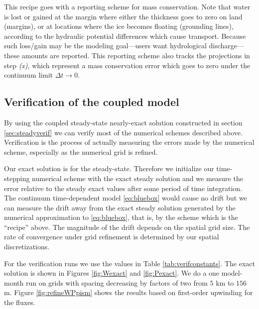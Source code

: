 \documentclass[11pt,final]{amsart}
\begin{document}
\medskip
This recipe goes with a reporting scheme for mass conservation.  Note that water is lost or gained at the margin where either the thickness goes to zero on land (margins), or at locations where the ice becomes floating (grounding lines), according to the hydraulic potential differences which cause transport.  Because such loss/gain may be the modeling goal---users want hydrological discharge---these amounts are reported.  This reporting scheme also tracks the projections in step \emph{(x)}, which represent a mass conservation error which goes to zero under the continuum limit $\Delta t\to 0$.

\subsection*{Verification of the coupled model}  By using the coupled steady-state nearly-exact solution constructed in section \ref{sec:steadyverif} we can verify most of the numerical schemes described above.  Verification is the process of actually measuring the errors made by the numerical scheme, especially as the numerical grid is refined.

Our exact solution is for the steady-state.  Therefore we initialize our time-stepping numerical scheme with the exact steady solution and we measure the error relative to the steady exact values after some period of time integration.  The continuum time-dependent model \eqref{eq:bluebox} would cause no drift but we can measure the drift away from the exact steady solution generated by the numerical approximation to \eqref{eq:bluebox}, that is, by the scheme which is the ``recipe'' above.  The magnitude of the drift depends on the spatial grid size.  The rate of convergence under grid refinement is determined by our spatial discretizations.

For the verification runs we use the values in Table \ref{tab:verifconstants}.  The exact solution is shown in Figures \ref{fig:Wexact} and \ref{fig:Pexact}.  We do a one model-month run on grids with spacing decreasing by factors of two from $5$ km to $156$ m.  Figure \ref{fig:refineWPpism} shows the results based on first-order upwinding for the fluxes.
\end{document}
